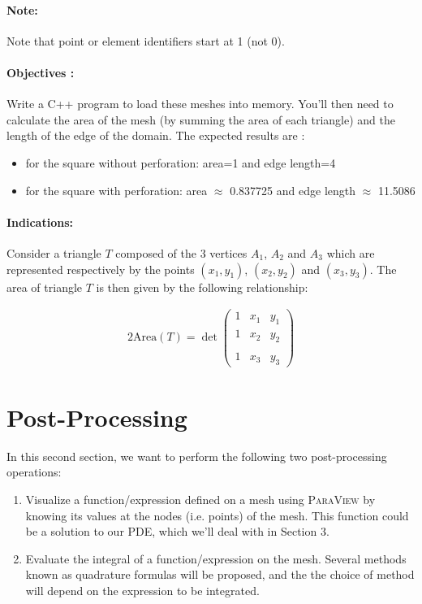 \documentclass[english,10pt,a4paper]{article}
\begin{document}
\paragraph{Note:} Note that point or element identifiers start at 1 (not 0).

\paragraph{Objectives :}
Write a C++ program to load these meshes into memory. You'll then need to calculate the area of the mesh (by summing the area of each triangle) and the length of the edge of the domain.
The expected results are :
\begin{itemize}
\item for the square without perforation: area=1 and edge length=4
\item for the square with perforation: area $\approx$ 0.837725 and edge length $\approx$ 11.5086
\end{itemize}


\paragraph{Indications:}
Consider a triangle $T$ composed of the 3 vertices $A_1$, $A_2$ and $A_3$ which are represented respectively by the points $(x_1,y_1)$, $(x_2,y_2)$ and $(x_3,y_3)$.
The area of triangle $T$ is then given by the following relationship:

\begin{eqnarray*}
2 \mathrm{Area}(T) = \det \left(
  \begin{matrix}
    1 & x_1 & y_1 \\
    1 & x_2 & y_2 \\\\
    1 & x_3 & y_3
  \end{matrix}
  \right)
\end{eqnarray*}




\section{Post-Processing}

In this second section, we want to perform the following two post-processing operations:
\begin{enumerate}
\item Visualize a function/expression defined on a mesh using \textsc{ParaView} by knowing its values at the nodes (i.e. points) of the mesh.
  This function could be a solution to our PDE, which we'll deal with in Section 3.
\item Evaluate the integral of a function/expression on the mesh. Several methods known as quadrature formulas will be proposed, and the
  the choice of method will depend on the expression to be integrated.
\end{enumerate}
\end{document}
